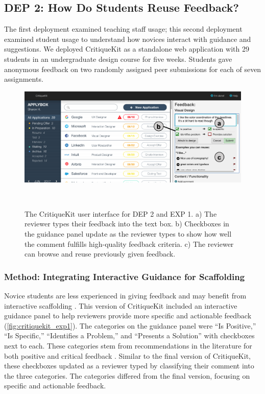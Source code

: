 \subsection{DEP 2: How Do Students Reuse Feedback?}
The first deployment examined teaching staff usage; this second deployment examined student usage to understand how novices interact with guidance and suggestions. We deployed CritiqueKit as a standalone web application with 29 students in an undergraduate design course for five weeks. Students gave anonymous feedback on two randomly assigned peer submissions for each of seven assignments.

\begin{figure}[b!]
\centering
  \includegraphics[width=\textwidth]{critiquekit/figures/old_interface.png}
  \caption[The CritiqueKit user interface for DEP 2 and EXP 1.]{The CritiqueKit user interface for DEP 2 and EXP 1. a) The reviewer types their feedback into the text box. b) Checkboxes in the guidance panel update as the reviewer types to show how well the comment fulfills high-quality feedback criteria. c) The reviewer can browse and reuse previously given feedback.}~\label{fig:critiquekit_exp1}
\end{figure}

\subsubsection{Method: Integrating Interactive Guidance for Scaffolding}
Novice students are less experienced in giving feedback and may benefit from interactive scaffolding \cite{Reiser2004}. This version of CritiqueKit included an interactive guidance panel to help reviewers provide more specific and actionable feedback (\autoref{fig:critiquekit_exp1}). The categories on the guidance panel were ``Is Positive,'' ``Is Specific,'' ``Identifies a Problem,'' and ``Presents a Solution'' with checkboxes next to each. These categories stem from recommendations in the literature for both positive and critical feedback \cite{Kelley2013}. Similar to the final version of CritiqueKit, these checkboxes updated as a reviewer typed by classifying their comment into the three categories. The categories differed from the final version, focusing on specific and actionable feedback. 

